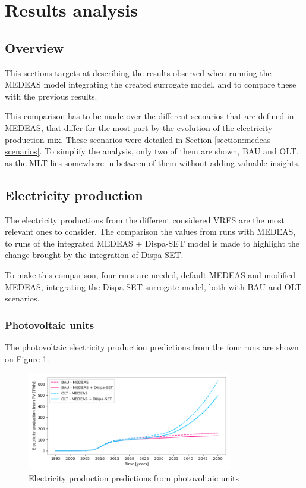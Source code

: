 \section{Results analysis}

\subsection{Overview}

This sections targets at describing the results observed when running the MEDEAS model integrating the created surrogate model, and to compare these with the previous results.

This comparison has to be made over the different scenarios that are defined in MEDEAS, that differ for the most part by the evolution of the electricity production mix. These scenarios were detailed in Section \ref{section:medeas-scenarios}. To simplify the analysis, only two of them are shown, BAU and OLT, as the MLT lies somewhere in between of them without adding valuable insights.

\subsection{Electricity production}

The electricity productions from the different considered VRES are the most relevant ones to consider. The comparison the values from runs with MEDEAS, to runs of the integrated MEDEAS + Dispa-SET model is made to highlight the change brought by the integration of Dispa-SET.

To make this comparison, four runs are needed, default MEDEAS and modified MEDEAS, integrating the Dispa-SET surrogate model, both with BAU and OLT scenarios.

\subsubsection{Photovoltaic units}

The photovoltaic electricity production predictions from the four runs are shown on Figure \ref{fig:electricity-production-PV}.

\begin{figure}[h]
    \centering
    \includegraphics[width=0.8\textwidth]{resources/images/electricity-production_PV.png}
    \caption{Electricity production predictions from photovoltaic units}
    \label{fig:electricity-production-PV}
\end{figure}

